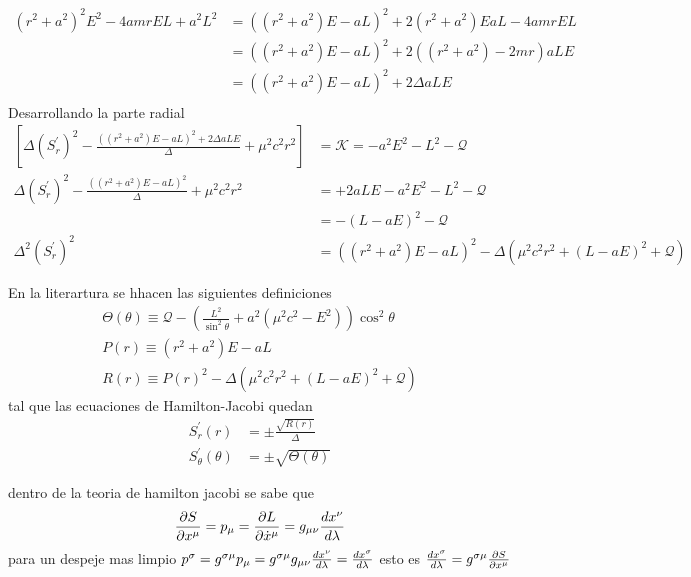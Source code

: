 \begin{equation}
    \begin{aligned}
    \left(r^2+a^2\right)^2 E^2-4 a m r E L+a^2 L^2 &=  \left(\left(r^2+a^2\right) E -aL\right)^2+2\left(r^2+a^2\right)EaL-4 a m r E L \\
    & =  \left(\left(r^2+a^2\right) E -aL\right)^2+2\left(\left(r^2+a^2\right)-2 m r\right)aLE  \\
    & =  \left(\left(r^2+a^2\right) E -aL\right)^2+2\Delta aLE   \\
    \end{aligned}
\end{equation}
Desarrollando la parte radial
\begin{align}
 \left[\Delta\left(S_r^{\prime}\right)^2-\frac{ \left(\left(r^2+a^2\right) E -aL\right)^2+2\Delta aLE }{\Delta}+\mu^2 c^2 r^2\right] & = \mathcal{K} = -a^2E^2 -L^2 -\mathcal{Q}\\
 \Delta\left(S_r^{\prime}\right)^2-\frac{ \left(\left(r^2+a^2\right) E -aL\right)^2 }{\Delta}+\mu^2 c^2 r^2 & =+2 aLE -a^2E^2 -L^2 -\mathcal{Q}\\
 & = -(L-aE )^2 -\mathcal{Q}  \\
  \Delta^2\left(S_r^{\prime}\right)^2 & =\left(\left(r^2+a^2\right) E -aL\right)^2- \Delta(\mu^2 c^2 r^2 +(L-aE )^2 +\mathcal{Q})
    \end{align} 

En la literartura se hhacen las siguientes definiciones
\begin{align}
 \Theta(\theta ) \equiv \mathcal{Q} - \left(\frac{ L^2}{\sin ^2 \theta}+a^2(\mu^2 c^2  -  E^2) \right)\cos ^2 \theta \\
 P(r) \equiv \left(r^2+a^2\right) E -aL \\
    R(r) \equiv P(r)^2- \Delta(\mu^2 c^2 r^2 +(L-aE )^2 +\mathcal{Q})
\end{align}
tal que las ecuaciones de Hamilton-Jacobi quedan
\begin{align}
S_r^{\prime}(r) & = \pm \frac{\sqrt{R(r)}}{\Delta} \\
S_\theta^{\prime}(\theta) & = \pm \sqrt{\Theta(\theta )}
\end{align}

dentro de la teoria de hamilton jacobi se sabe que
\begin{equation}
\frac{\partial S}{\partial x^\mu} = p_\mu = \frac{\partial L}{\partial \dot{x}^\mu} = g_{\mu \nu} \frac{d x^\nu}{d \lambda}
\end{equation}
para un despeje mas  limpio $p^\sigma = g^{\sigma \mu} p_\mu = g^{\sigma \mu} g_{\mu \nu} \frac{d x^\nu}{d \lambda} = \frac{d x^\sigma}{d \lambda}$ esto es $\frac{d x^\sigma}{d \lambda} = g^{\sigma \mu}\frac{\partial S}{\partial x^\mu}$

